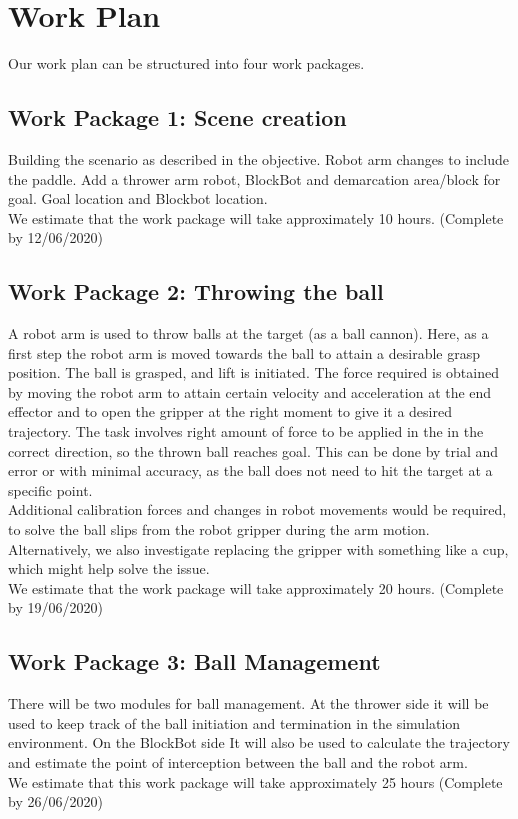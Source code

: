 \documentclass[12pt,pdftex,a4paper]{article}
\begin{document}
\section*{Work Plan}
Our work plan can be structured into four work packages.

\subsection*{Work Package 1: Scene creation}
Building the scenario as described in the objective.
Robot arm changes to include the paddle.
Add a thrower arm robot, BlockBot and demarcation area/block for goal.
Goal location and Blockbot location. \\
$ $ \\
We estimate that the work package will take approximately 10 hours. (Complete by 12/06/2020)

\subsection*{Work Package 2: Throwing the ball}
A robot arm is used to throw balls at the target (as a ball cannon).
Here, as a first step the robot arm is moved towards the ball to attain a desirable grasp position.
The ball is grasped, and lift is initiated.
The force required is obtained by moving the robot arm to attain certain velocity and acceleration at the end effector and to open the gripper at the right moment to give it a desired trajectory.
The task involves right amount of force to be applied in the in the correct direction, so the thrown ball reaches goal.
This can be done by trial and error or with minimal accuracy, as the ball does not need to hit the target at a specific point. \\
$ $ \\
Additional calibration forces and changes in robot movements would be required, to solve the ball slips from the robot gripper during the arm motion.
Alternatively, we also investigate replacing the gripper with something like a cup, which might help solve the issue. \\
$ $ \\
We estimate that the work package will take approximately 20 hours. (Complete by 19/06/2020)

\subsection*{Work Package 3: Ball Management}
There will be two modules for ball management.
At the thrower side it will be used to keep track of the ball initiation and termination in the simulation environment.
On the BlockBot side It will also be used to calculate the trajectory and estimate the point of interception between the ball and the robot arm. \\
$ $ \\
We estimate that this work package will take approximately 25 hours (Complete by 26/06/2020)
\end{document}
